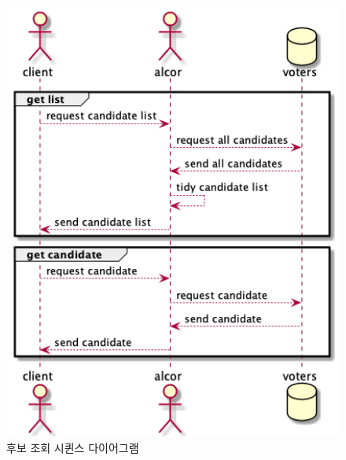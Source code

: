 \documentclass[10pt,a4paper,left=15mm,right=15mm,top=20mm,bottom=20mm]{article}
\begin{document}
    \begin{figure}[h]
        \begin{center}
            \includegraphics[width=14cm]{candidate-getlist}
            \caption{후보 조회 시퀸스 다이어그램}
        \end{center}
    \end{figure}
\end{document}
